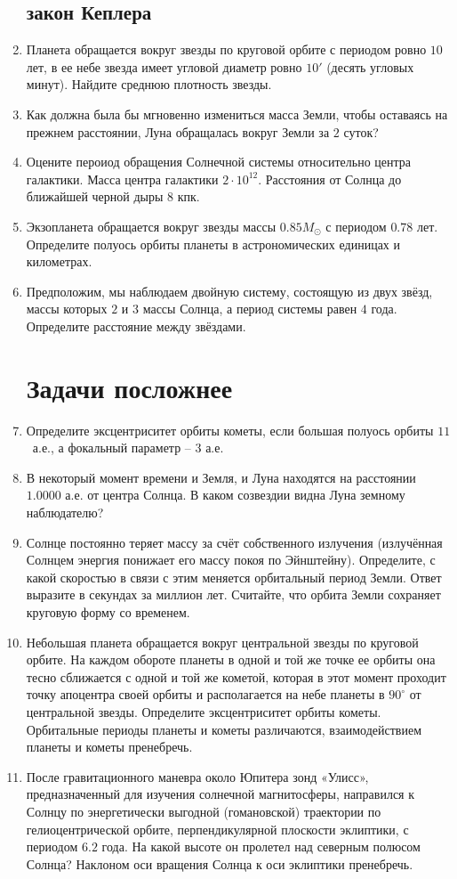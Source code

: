 \documentclass[12pt]{article}
\newcommand{\RomanNumeralCaps}[1]
{\MakeUppercase{\romannumeral #1}}
\begin{document}
\begin{enumerate}
	\subsection*{\RomanNumeralCaps{3} закон Кеплера}
    \item Планета обращается вокруг звезды по круговой орбите с периодом ровно $10$ лет, в ее небе звезда имеет угловой диаметр ровно $10'$ (десять угловых минут). Найдите среднюю плотность звезды.
    \item Как должна была бы мгновенно измениться масса Земли, чтобы оставаясь на прежнем расстоянии, Луна обращалась вокруг Земли за $2$ суток? %
    \item Оцените пероиод обращения Солнечной системы относительно центра галактики. Масса центра галактики $2\cdot10^{12}$. Расстояния от Солнца до ближайшей черной дыры $8$ кпк. %
    \item Экзопланета обращается вокруг звезды массы $0.85 M_{\odot}$ с периодом $0.78$ лет. Определите полуось орбиты планеты в астрономических единицах и километрах. %
    \item Предположим, мы наблюдаем двойную систему, состоящую из двух звёзд, массы которых $2$ и $3$ массы Солнца, а период системы равен $4$ года. Определите расстояние между звёздами. %
	
    \section*{Задачи посложнее}
    \item{Определите эксцентриситет орбиты кометы, если большая полуось орбиты $11$~а.е., а фокальный параметр -- $3$ а.е.}
    \item{В некоторый момент времени и Земля, и Луна находятся на расстоянии $1.0000$ а.е. от центра Солнца. В каком созвездии видна Луна земному наблюдателю?}
    \item{Солнце постоянно теряет массу за счёт собственного излучения (излучённая Солнцем энергия понижает его массу покоя по Эйнштейну). Определите, с какой скоростью в связи с этим меняется орбитальный период Земли. Ответ выразите в секундах за миллион лет. Считайте, что орбита Земли сохраняет круговую форму со временем.}
    \item{Небольшая планета обращается вокруг центральной звезды по круговой орбите. На каждом обороте планеты в одной и той же точке ее орбиты она тесно сближается с одной и той же кометой, которая в этот момент проходит точку апоцентра своей орбиты и располагается на небе планеты в $90^{\circ}$ от центральной звезды. Определите эксцентриситет орбиты кометы. Орбитальные периоды планеты и кометы различаются, взаимодействием планеты и кометы пренебречь.}
    \item{После гравитационного маневра около Юпитера зонд «Улисс», предназначенный для изучения солнечной магнитосферы, направился к Солнцу по энергетически выгодной (гомановской) траектории по гелиоцентрической орбите, перпендикулярной плоскости эклиптики, с периодом $6.2$ года. На какой высоте он пролетел над северным полюсом Солнца? Наклоном оси вращения Солнца к оси эклиптики пренебречь.}

\end{enumerate}
\end{document}
